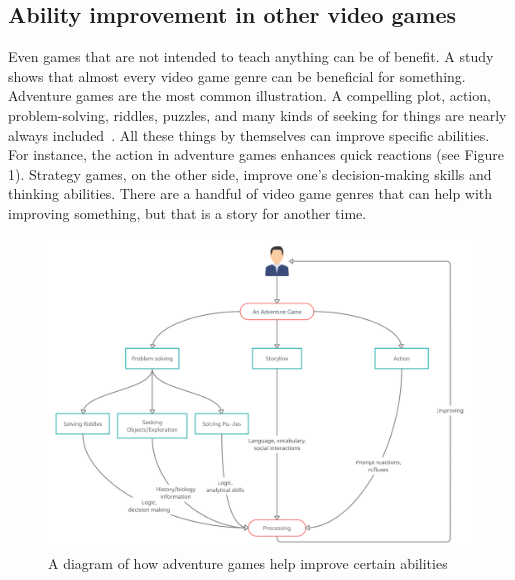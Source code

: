 \documentclass[10pt,twoside,english,a4paper]{article}
\begin{document}
\subsection{Ability improvement in other video games}
Even games that are not intended to teach anything can be of benefit. A study shows that almost every video game genre can be beneficial for something. Adventure games are the most common illustration. A compelling plot, action, problem-solving, riddles, puzzles, and many kinds of seeking for things are nearly always included~\cite{learning}. All these things by themselves can improve specific abilities. For instance, the action in adventure games enhances quick reactions (see Figure 1). Strategy games, on the other side, improve one's decision-making skills and thinking abilities. There are a handful of video game genres that can help with improving something, but that is a story for another time. 

\begin{figure}[h]
\centering
\includegraphics[scale=0.16]{adventure}
\caption{A diagram of how adventure games help improve certain abilities}
\end{figure}
\end{document}
